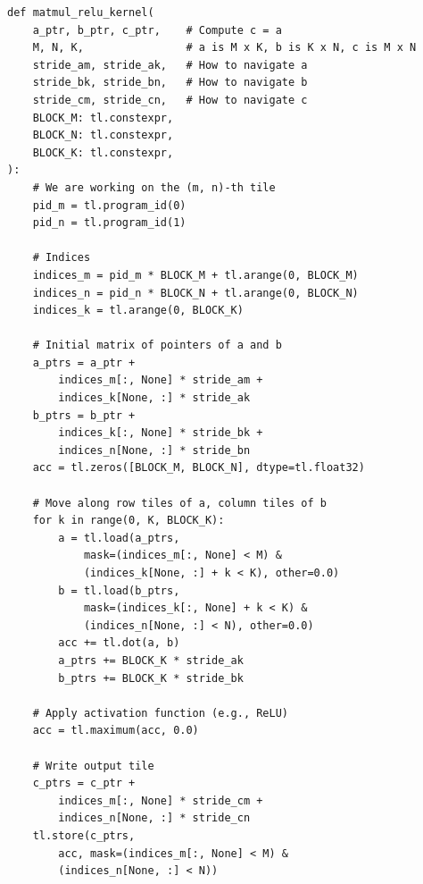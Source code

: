\documentclass[12pt,twoside]{article}
\begin{document}
\begin{verbatim}
def matmul_relu_kernel(
    a_ptr, b_ptr, c_ptr,    # Compute c = a 
    M, N, K,                # a is M x K, b is K x N, c is M x N
    stride_am, stride_ak,   # How to navigate a
    stride_bk, stride_bn,   # How to navigate b
    stride_cm, stride_cn,   # How to navigate c
    BLOCK_M: tl.constexpr,
    BLOCK_N: tl.constexpr,
    BLOCK_K: tl.constexpr,
):
    # We are working on the (m, n)-th tile
    pid_m = tl.program_id(0)
    pid_n = tl.program_id(1)
    
    # Indices
    indices_m = pid_m * BLOCK_M + tl.arange(0, BLOCK_M)
    indices_n = pid_n * BLOCK_N + tl.arange(0, BLOCK_N)
    indices_k = tl.arange(0, BLOCK_K)                  
    
    # Initial matrix of pointers of a and b
    a_ptrs = a_ptr + 
        indices_m[:, None] * stride_am + 
        indices_k[None, :] * stride_ak
    b_ptrs = b_ptr + 
        indices_k[:, None] * stride_bk + 
        indices_n[None, :] * stride_bn
    acc = tl.zeros([BLOCK_M, BLOCK_N], dtype=tl.float32)
    
    # Move along row tiles of a, column tiles of b
    for k in range(0, K, BLOCK_K):
        a = tl.load(a_ptrs, 
            mask=(indices_m[:, None] < M) & 
            (indices_k[None, :] + k < K), other=0.0)
        b = tl.load(b_ptrs, 
            mask=(indices_k[:, None] + k < K) & 
            (indices_n[None, :] < N), other=0.0)
        acc += tl.dot(a, b)
        a_ptrs += BLOCK_K * stride_ak
        b_ptrs += BLOCK_K * stride_bk
    
    # Apply activation function (e.g., ReLU)
    acc = tl.maximum(acc, 0.0)
    
    # Write output tile
    c_ptrs = c_ptr + 
        indices_m[:, None] * stride_cm + 
        indices_n[None, :] * stride_cn
    tl.store(c_ptrs, 
        acc, mask=(indices_m[:, None] < M) & 
        (indices_n[None, :] < N))
\end{verbatim}
\end{document}
